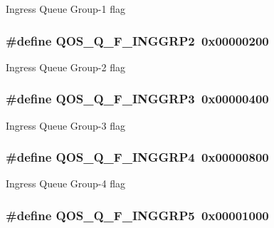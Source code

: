 Ingress Queue Group-\/1 flag \hypertarget{group__FAPI__QOS__QUEUE_gab6da64324452e6385a5a045e438240cb}{
\subsubsection[{Q\-O\-S\-\_\-\-Q\-\_\-\-F\-\_\-\-I\-N\-G\-G\-R\-P2}]{\setlength{\rightskip}{0pt plus 5cm}\#define Q\-O\-S\-\_\-\-Q\-\_\-\-F\-\_\-\-I\-N\-G\-G\-R\-P2~0x00000200}}\label{group__FAPI__QOS__QUEUE_gab6da64324452e6385a5a045e438240cb}
Ingress Queue Group-\/2 flag \hypertarget{group__FAPI__QOS__QUEUE_ga1de29a6e534286eb607bf16191d8d94b}{
\subsubsection[{Q\-O\-S\-\_\-\-Q\-\_\-\-F\-\_\-\-I\-N\-G\-G\-R\-P3}]{\setlength{\rightskip}{0pt plus 5cm}\#define Q\-O\-S\-\_\-\-Q\-\_\-\-F\-\_\-\-I\-N\-G\-G\-R\-P3~0x00000400}}\label{group__FAPI__QOS__QUEUE_ga1de29a6e534286eb607bf16191d8d94b}
Ingress Queue Group-\/3 flag \hypertarget{group__FAPI__QOS__QUEUE_ga4f50900ef23e2fb31aeac3eb9932c8be}{
\subsubsection[{Q\-O\-S\-\_\-\-Q\-\_\-\-F\-\_\-\-I\-N\-G\-G\-R\-P4}]{\setlength{\rightskip}{0pt plus 5cm}\#define Q\-O\-S\-\_\-\-Q\-\_\-\-F\-\_\-\-I\-N\-G\-G\-R\-P4~0x00000800}}\label{group__FAPI__QOS__QUEUE_ga4f50900ef23e2fb31aeac3eb9932c8be}
Ingress Queue Group-\/4 flag \hypertarget{group__FAPI__QOS__QUEUE_ga1ce6f7b2edbc2fb87b3e0bf2c2da231d}{
\subsubsection[{Q\-O\-S\-\_\-\-Q\-\_\-\-F\-\_\-\-I\-N\-G\-G\-R\-P5}]{\setlength{\rightskip}{0pt plus 5cm}\#define Q\-O\-S\-\_\-\-Q\-\_\-\-F\-\_\-\-I\-N\-G\-G\-R\-P5~0x00001000}}\label{group__FAPI__QOS__QUEUE_ga1ce6f7b2edbc2fb87b3e0bf2c2da231d}

